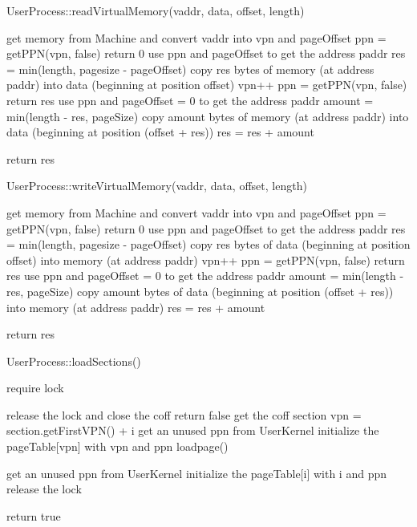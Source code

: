 \documentclass[a4paper,10pt]{article}
\begin{document}
\begin{algorithm}
\caption{UserProcess::readVirtualMemory(vaddr, data, offset, length)}
get memory from Machine and convert vaddr into vpn and pageOffset\;
ppn = getPPN(vpn, false)\;
      {
           return 0\;
      }
use ppn and pageOffset to get the address paddr\;
res = min(length, pagesize - pageOffset)\;
copy res bytes of memory (at address paddr) into data (beginning at position offset)\;
 {
    vpn++\;
    ppn = getPPN(vpn, false)\;
      {
           return res\;
      }
    use ppn and pageOffset = 0 to get the address paddr\;
    amount = min(length - res, pageSize)\;
   copy amount bytes of memory (at address paddr) into data (beginning at position (offset + res))\;
   res = res + amount\;
 }

return res\;
\end{algorithm}

\begin{algorithm}
\caption{UserProcess::writeVirtualMemory(vaddr, data, offset, length)}
get memory from Machine and convert vaddr into vpn and pageOffset\;
ppn = getPPN(vpn, false)\;
      {
           return 0\;
      }
use ppn and pageOffset to get the address paddr\;
res = min(length, pagesize - pageOffset)\;
copy res bytes of data (beginning at position offset) into memory (at address paddr)\;
 {
    vpn++\;
    ppn = getPPN(vpn, false)\;
      {
           return res\;
      }
    use ppn and pageOffset = 0 to get the address paddr\;
    amount = min(length - res, pageSize)\;
    copy amount bytes of data (beginning at position (offset + res)) into memory (at address paddr)\;
    res = res + amount\;
 }

return res\;
\end{algorithm}

\begin{algorithm}
\caption{UserProcess::loadSections()}
require lock\;

      {
           release the lock and close the coff\;
           return false\;
      }
{
     get the coff section\;
     {
         vpn = section.getFirstVPN() + i\;
         get an unused ppn from UserKernel\;
         initialize the pageTable[vpn] with vpn and ppn\;
         loadpage()\;
     }
}

{
     {
          get an unused ppn from UserKernel\;
          initialize the pageTable[i] with i and ppn\;
     }
}
release the lock\;

return true\;
\end{algorithm}
\end{document}
